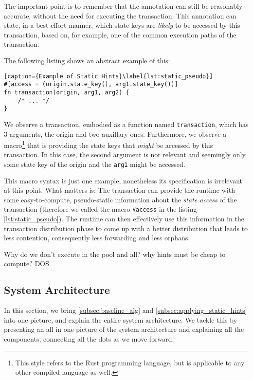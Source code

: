 The important point is to remember that the annotation can still be reasonably accurate, without the
need for executing the transaction. This annotation can state, in a best effort manner, which state
keys are \textit{likely} to be accessed by this transaction, based on, for example, one of the
common execution paths of the transaction.

The following listing shows an abstract example of this:

\begin{lstlisting}[caption={Example of Static Hints}\label{lst:static_pseudo}]
#[access = (origin.state_key(), arg1.state_key())]
fn transaction(origin, arg1, arg2) {
	/* ... */
}
\end{lstlisting}

We observe a transaction, embodied as a function named \texttt{transaction}, which has 3 arguments,
the origin and two auxillary ones. Furthermore, we observe a macro\footnote{This style refers to the
Rust programming language, but is applicable to any other compiled language as well.} that is
providing the state keys that \textit{might} be accessed by this transaction. In this case, the
second argument is not relevant and seemingly only some state key of the origin and the
\texttt{arg1} might be accessed.

This macro syntax is just one example, nonetheless its specification is irrelevant at this point.
What matters is: The transaction can provide the runtime with some easy-to-compute, pseudo-static
information about the \textit{state access} of the transaction (therefore we called the macro
\texttt{\#access} in the listing \ref{lst:static_pseudo}). The runtime can then effectively use this
information in the transaction distribution phase to come up with a better distribution that leads
to less contention, consequently less forwarding and less orphans.

\begin{remark}
	Why do we don't execute in the pool and all? why hints must be cheap to compute? DOS.
\end{remark}

\subsection{System Architecture}


In this section, we bring \ref{subsec:baseline_alg} and \ref{subsec:applying_static_hints} into one
picture, and explain the entire system architecture. We tackle this by presenting an all in one
picture of the system architecture and explaining all the components, connecting all the dots as we
move forward.

